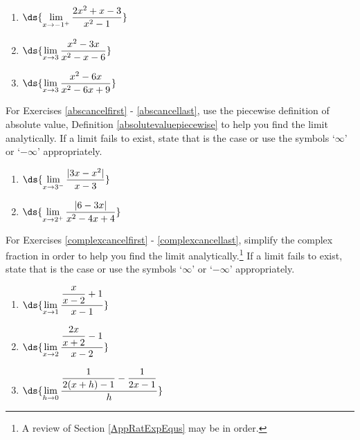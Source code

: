 \documentclass{ximera}
\begin{document}
\begin{multicols}{3}

\begin{enumerate}
\setcounter{enumi}{\value{HW}}

\item   $\ds{\lim_{x \rightarrow -1^{+}} \dfrac{2x^2+x-3}{x^2-1}}$

\item  $\ds{\lim_{x \rightarrow 3} \dfrac{x^2-3x}{x^2-x-6}}$

\item\label{factorcancellast}  $\ds{\lim_{x \rightarrow 3} \dfrac{x^2-6x}{x^2-6x+9}}$

\setcounter{HW}{\value{enumi}}
\end{enumerate}

\end{multicols}

For Exercises \ref{abscancelfirst} - \ref{abscancellast}, use the piecewise definition of absolute value, Definition \ref{absolutevaluepiecewise} to help you find the limit analytically.    If a limit fails to exist, state that is the case  or use the symbols `$\infty$' or `$-\infty$' appropriately.

\begin{multicols}{2}
\begin{enumerate}
\setcounter{enumi}{\value{HW}}

\item\label{abscancelfirst} $\ds{ \lim_{x \rightarrow 3^{-}} \dfrac{|3x - x^2| }{x-3}}$     

\item\label{abscancellast}  $\ds{\lim_{x \rightarrow 2^{+}} \dfrac{|6-3x|}{x^2-4x+4}}$

\setcounter{HW}{\value{enumi}}
\end{enumerate}
\end{multicols}

For Exercises \ref{complexcancelfirst} - \ref{complexcancellast}, simplify the complex fraction in order to help you find the limit analytically.\footnote{A review of Section \ref{AppRatExpEqus} may be in order.}  If a limit fails to exist, state that is the case  or use the symbols `$\infty$' or `$-\infty$' appropriately.

\begin{multicols}{3}
\begin{enumerate}
\setcounter{enumi}{\value{HW}}

\item\label{complexcancelfirst}  $\ds{\lim_{x \rightarrow 1} \dfrac{\dfrac{x}{x-2} +1}{x-1}}$

\item $\ds{ \lim_{x \rightarrow 2} \dfrac{\dfrac{2x}{x+2}  -1}{x-2} }$ 
     
\item\label{complexcancellast} $\ds{ \lim_{h \rightarrow 0} \dfrac{\dfrac{1}{2(x+h) - 1}  - \dfrac{1}{2x-1} }{h} }$ 

\setcounter{HW}{\value{enumi}}
\end{enumerate}
\end{multicols}
\end{document}
